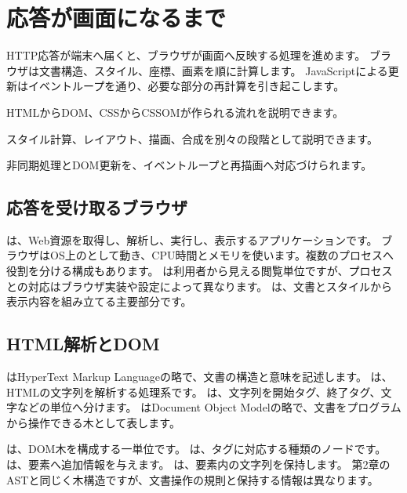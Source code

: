 \chapter{応答が画面になるまで}
\label{chap:browser}

\begin{chapterabstract}
HTTP応答が端末へ届くと、ブラウザが画面へ反映する処理を進めます。
ブラウザは文書構造、スタイル、座標、画素を順に計算します。
JavaScriptによる更新はイベントループを通り、必要な部分の再計算を引き起こします。
\end{chapterabstract}

\begin{learninggoals}
  \item HTMLからDOM、CSSからCSSOMが作られる流れを説明できます。
  \item スタイル計算、レイアウト、描画、合成を別々の段階として説明できます。
  \item 非同期処理とDOM更新を、イベントループと再描画へ対応づけられます。
\end{learninggoals}


\section{応答を受け取るブラウザ}

は、Web資源を取得し、解析し、実行し、表示するアプリケーションです。
ブラウザはOS上のとして動き、CPU時間とメモリを使います。複数のプロセスへ役割を分ける構成もあります。
は利用者から見える閲覧単位ですが、プロセスとの対応はブラウザ実装や設定によって異なります。
は、文書とスタイルから表示内容を組み立てる主要部分です。

\section{HTML解析とDOM}

はHyperText Markup Languageの略で、文書の構造と意味を記述します。
は、HTMLの文字列を解析する処理系です。
は、文字列を開始タグ、終了タグ、文字などの単位へ分けます。
はDocument Object Modelの略で、文書をプログラムから操作できる木として表します。

は、DOM木を構成する一単位です。
は、タグに対応する種類のノードです。
は、要素へ追加情報を与えます。
は、要素内の文字列を保持します。
第2章のASTと同じく木構造ですが、文書操作の規則と保持する情報は異なります。

